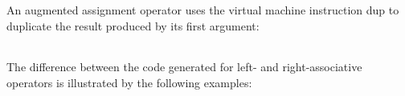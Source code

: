 An augmented assignment operator uses the virtual machine instruction
dup to duplicate the result produced by its first argument:

\begin{center}
\tabletail{}
\tablelasttail{}
\begin{supertabular}{|m{1.9073598in}|m{2.75596in}|}

\end{supertabular}
\end{center}

The difference between the code generated for left- and
right-associative operators is illustrated by the following examples:

\begin{center}
\tabletail{}
\tablelasttail{}
\begin{supertabular}{|m{1.9073598in}|m{2.75596in}|}

\end{supertabular}
\end{center}

